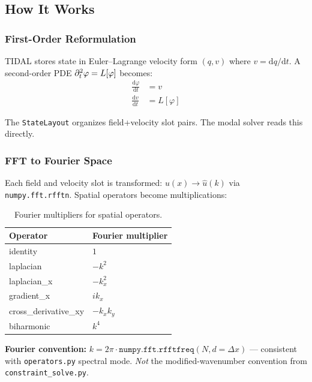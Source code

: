 \subsection{How It Works}
\label{sec:modal-how}

\subsubsection{First-Order Reformulation}
\label{sec:modal-first-order}

TIDAL stores state in Euler--Lagrange velocity form $(q, v)$ where $v = \mathrm{d}q/\mathrm{d}t$. A second-order PDE $\partial_t^2 \varphi = L[\varphi]$ becomes:
\begin{align}
  \frac{\mathrm{d}\varphi}{\mathrm{d}t} &= v \\
  \frac{\mathrm{d}v}{\mathrm{d}t} &= L[\varphi]
\end{align}

The \texttt{StateLayout} organizes field+velocity slot pairs. The modal solver reads this directly.

\subsubsection{FFT to Fourier Space}
\label{sec:modal-fft}

Each field and velocity slot is transformed: $u(x) \to \hat{u}(k)$ via \texttt{numpy.fft.rfftn}. Spatial operators become multiplications:

\begin{table}[htbp]
\centering
\caption{Fourier multipliers for spatial operators.}
\label{tab:fourier-multipliers}
\begin{tabular}{@{}ll@{}}
\toprule
Operator & Fourier multiplier \\
\midrule
identity & $1$ \\
laplacian & $-k^2$ \\
laplacian\_x & $-k_x^2$ \\
gradient\_x & $ik_x$ \\
cross\_derivative\_xy & $-k_x k_y$ \\
biharmonic & $k^4$ \\
\bottomrule
\end{tabular}
\end{table}

\textbf{Fourier convention:} $k = 2\pi \cdot \texttt{numpy.fft.rfftfreq}(N, d=\Delta x)$ --- consistent with \texttt{operators.py} spectral mode. \emph{Not} the modified-wavenumber convention from \texttt{constraint\_solve.py}.

